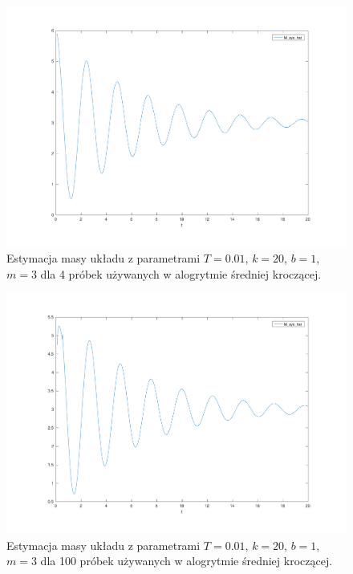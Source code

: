 \documentclass[a4paper, 10pt]{article}
\begin{document}
\begin{figure}[H]
	\includegraphics[width=0.99\linewidth]{systemfs4_mass}
	\centering
	\caption{Estymacja masy układu z parametrami $T=0.01$, $k = 20$, $b = 1$, $m = 3$ dla 4 próbek używanych w alogrytmie średniej kroczącej. }
	\label{fig:systemfs4_mass}
\end{figure}

\begin{figure}[H]
	\includegraphics[width=0.99\linewidth]{systemfs100_mass}
	\centering
	\caption{Estymacja masy układu z parametrami $T=0.01$, $k = 20$, $b = 1$, $m = 3$ dla 100 próbek używanych w alogrytmie średniej kroczącej.}
	\label{fig:systemfs100_mass}
\end{figure}
\end{document}
